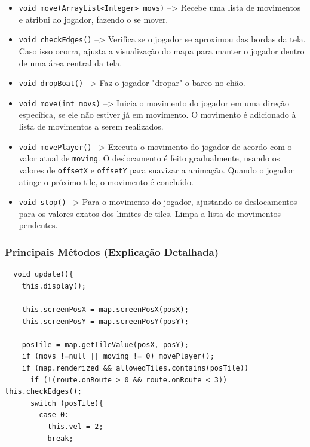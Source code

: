 \documentclass[
	12pt,				%
	oneside,			%
	a4paper,			%
	english,			%
	brazil,				%
	]{abntex2}
\begin{document}
{\begin{itemize}
    \item \texttt{void move(ArrayList<Integer> movs)} --> Recebe uma lista de movimentos e atribui ao jogador, fazendo o se mover.
    
    \item \texttt{void checkEdges()} --> Verifica se o jogador se aproximou das bordas da tela. Caso isso ocorra, ajusta a visualização do mapa para manter o jogador dentro de uma área central da tela.
    
    \item \texttt{void dropBoat()} --> Faz o jogador "dropar" o barco no chão.

    \item \texttt{void move(int movs)} --> Inicia o movimento do jogador em uma direção específica, se ele não estiver já em movimento. O movimento é adicionado à lista de movimentos a serem realizados.
    
    \item \texttt{void movePlayer()} --> Executa o movimento do jogador de acordo com o valor atual de \texttt{moving}. O deslocamento é feito gradualmente, usando os valores de \texttt{offsetX} e \texttt{offsetY} para suavizar a animação. Quando o jogador atinge o próximo tile, o movimento é concluído.
    
    \item \texttt{void stop()} --> Para o movimento do jogador, ajustando os deslocamentos para os valores exatos dos limites de tiles. Limpa a lista de movimentos pendentes.
\end{itemize}

\subsubsection{Principais Métodos (Explicação Detalhada)}


\begin{lstlisting}
  void update(){
    this.display();
    
    this.screenPosX = map.screenPosX(posX);
    this.screenPosY = map.screenPosY(posY);

    posTile = map.getTileValue(posX, posY);
    if (movs !=null || moving != 0) movePlayer();
    if (map.renderized && allowedTiles.contains(posTile))
      if (!(route.onRoute > 0 && route.onRoute < 3)) this.checkEdges();
      switch (posTile){
        case 0:
          this.vel = 2;
          break;
          

\end{lstlisting}}
\end{document}
